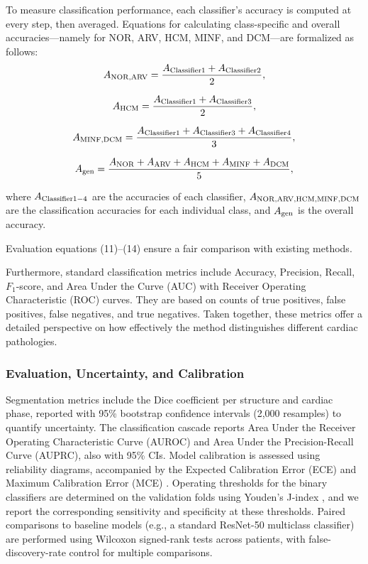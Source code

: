 \documentclass[fleqn,10pt]{wlscirep}
\begin{document}
To measure classification performance, each classifier's accuracy is computed at every step, then averaged. Equations for calculating class-specific and overall accuracies---namely for NOR, ARV, HCM, MINF, and DCM---are formalized as follows:
\begin{equation}
    {A_{{\rm{NOR}}{\rm{,ARV}}}} = \frac{{{A_{{\rm{Classifier 1}}}} + {A_{{\rm{Classifier 2}}}}}}{2},
\end{equation}

\begin{equation}
    {A_{{\rm{HCM}}}} = \frac{{{A_{{\rm{Classifier 1}}}} + {A_{{\rm{Classifier 3}}}}}}{2},
\end{equation}

\begin{equation}
    {A_{{\rm{MINF}}{\rm{,DCM}}}} = \frac{{{A_{{\rm{Classifier 1}}}} + {A_{{\rm{Classifier 3}}}} + {A_{{\rm{Classifier 4}}}}}}{3},
\end{equation}

\begin{equation}
    {A_{{\rm{gen}}}} = \frac{{{A_{{\rm{NOR}}}} + {A_{{\rm{ARV}}}} + {A_{{\rm{HCM}}}} + {A_{{\rm{MINF}}}} + {A_{{\rm{DCM}}}}}}{5},
\end{equation}

where \({A_{{\rm{Classifier 1 - 4}}}}\) are the accuracies of each classifier, \({A_{{\rm{NOR}}{\rm{, ARV}}{\rm{, HCM}}{\rm{, MINF}}{\rm{, DCM}}}}\) are the classification accuracies for each individual class, and \({A_{{\rm{gen}}}}\) is the overall accuracy.

Evaluation equations (11)--(14) ensure a fair comparison with existing methods.

Furthermore, standard classification metrics include Accuracy, Precision, Recall, \({F_1}\)-score, and Area Under the Curve (AUC) with Receiver Operating Characteristic (ROC) curves. They are based on counts of true positives, false positives, false negatives, and true negatives. Taken together, these metrics offer a detailed perspective on how effectively the method distinguishes different cardiac pathologies.

\subsubsection*{Evaluation, Uncertainty, and Calibration}
Segmentation metrics include the Dice coefficient per structure and cardiac phase, reported with 95\% bootstrap confidence intervals (2,000 resamples) to quantify uncertainty. The classification cascade reports Area Under the Receiver Operating Characteristic Curve (AUROC) and Area Under the Precision-Recall Curve (AUPRC), also with 95\% CIs. Model calibration is assessed using reliability diagrams, accompanied by the Expected Calibration Error (ECE) and Maximum Calibration Error (MCE) \cite{Guo:2017}. Operating thresholds for the binary classifiers are determined on the validation folds using Youden's J-index \cite{Youden:1950}, and we report the corresponding sensitivity and specificity at these thresholds. Paired comparisons to baseline models (e.g., a standard ResNet-50 multiclass classifier) are performed using Wilcoxon signed-rank tests across patients, with false-discovery-rate control for multiple comparisons.
\end{document}
